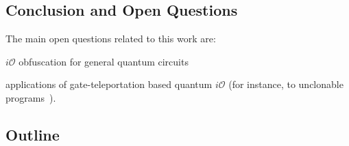 \subsection{Conclusion and Open Questions}

The main open questions related to this work are:

$i\mathcal{O}$ obfuscation for general quantum circuits

applications of gate-teleportation based quantum $i\mathcal{O}$ (for instance, to unclonable programs~\cite{Aar09}).


\subsection*{Outline}
